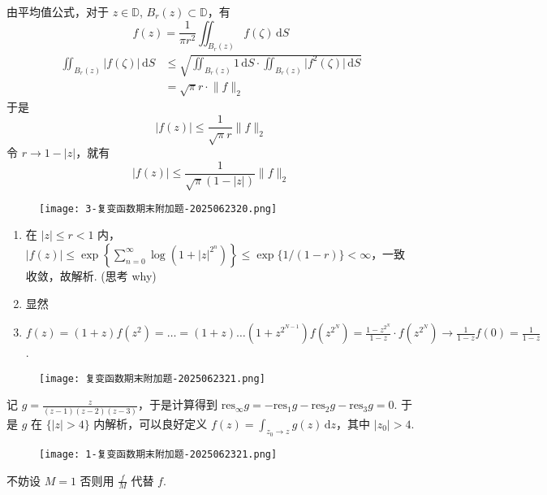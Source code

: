 由平均值公式，对于 $z\in \mathbb{D}$, $B_{r}(z)\subset \mathbb{D}$，有
\[
f(z)=\frac{1}{\pi r^{2}}\iint_{B_{r}(z)}f(\zeta)\,\mathrm{d}S  
\]
\[
\begin{aligned}
\iint_{B_{r}(z)}\lvert f(\zeta) \rvert \,\mathrm{d}S   & \leq \sqrt{ \iint_{B_{r}(z)}1\,\mathrm{d}S  \cdot\iint_{B_{r}(z)}\lvert f^{2}(\zeta) \rvert \,\mathrm{d}S  }  \\
 & =\sqrt{ \pi }r \cdot \lVert f \rVert _{2}
\end{aligned}
\]
于是
\[
\lvert f(z) \rvert \leq \frac{1}{\sqrt{ \pi }r}\lVert f \rVert _{2}
\]
令 $r\to1-\lvert z \rvert$，就有
\[
\lvert f(z) \rvert \leq \frac{1}{\sqrt{ \pi }(1-\lvert z \rvert )}\lVert f \rVert _{2}
\]
\begin{figure}[H]
\centering
\texttt{[image: 3-复变函数期末附加题-2025062320.png]}
\label{}
\end{figure}

\begin{enumerate}
	\item 在 $\lvert z \rvert\leq r<1$ 内，$\lvert f(z) \rvert\leq \exp \left\{  \sum_{n=0}^{\infty}\log(1+\lvert z \rvert ^{2^{n}})  \right\}\leq \exp \{ 1/(1-r) \}<\infty$，一致收敛，故解析. (思考 why)
	\item 显然
	\item $f(z)=(1+z)f(z^{2})=\dots=(1+z)\dots(1+z^{2^{N-1}})f(z^{2^{N}})=\frac{1-z^{2^{N}}}{1-z}\cdot f(z^{2^{N}})\to\frac{1}{1-z}f(0)=\frac{1}{1-z}$.
\end{enumerate}

\begin{figure}[H]
\centering
\texttt{[image: 复变函数期末附加题-2025062321.png]}
\label{}
\end{figure}

记 $g=\frac{z}{(z-1)(z-2)(z-3)}$，于是计算得到 $\mathrm{res}_{\infty}g=-\mathrm{res}_{1}g-\mathrm{res}_{2}g-\mathrm{res}_{3}g=0$. 于是 $g$ 在 $\{ \lvert z \rvert>4 \}$ 内解析，可以良好定义 $f(z)=\int_{z_0\to z}^{} g(z) \, \mathrm{d}z$，其中 $\lvert z_0 \rvert>4$.

\begin{figure}[H]
\centering
\texttt{[image: 1-复变函数期末附加题-2025062321.png]}
\label{}
\end{figure}

不妨设 $M=1$ 否则用 $\frac{f}{M}$ 代替 $f$.

